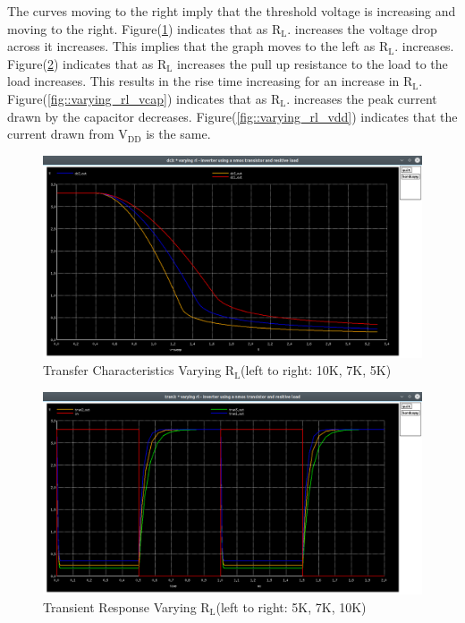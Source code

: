 \documentclass[12pt]{article}
\begin{document}
	The curves moving to the right imply that the threshold voltage is increasing and moving to the right. Figure(\ref{fig::varying_rl_dc}) indicates that as $\text{R}_\text{L}$. increases the voltage drop across it increases. This implies that the graph moves to the left as $\text{R}_\text{L}$. increases.\\
	Figure(\ref{fig::varying_rl_time}) indicates that as $\text{R}_\text{L}$ increases the pull up resistance to the load to the load increases. This results in the rise time increasing for an increase in $\text{R}_\text{L}$.\\
	Figure(\ref{fig::varying_rl_vcap}) indicates that as $\text{R}_\text{L}$. increases the peak current drawn by the capacitor decreases. Figure(\ref{fig::varying_rl_vdd}) indicates that the current drawn from $\text{V}_{\text{DD}}$ is the same.
	\begin{figure}[H]
		\begin{center}
			\includegraphics[scale=0.25]{images/inverter_Rl_dc.png}
			\caption{Transfer Characteristics Varying $\text{R}_\text{L}$(left to right: 10K, 7K, 5K)}
			\label{fig::varying_rl_dc}
		\end{center}
	\end{figure}
	\begin{figure}[H]
		\begin{center}
			\includegraphics[scale=0.25]{images/inverter_Rl_tran.png}
			\caption{Transient Response Varying $\text{R}_\text{L}$(left to right: 5K, 7K, 10K)}
			\label{fig::varying_rl_time}
		\end{center}
	\end{figure}
	
\end{document}
